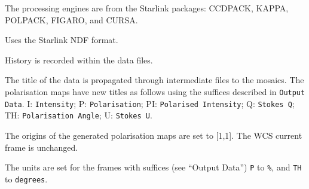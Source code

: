 \documentclass[twoside,11pt]{article}
\newcommand{\htmlref}[2]{#1}
\newcommand{\xref}[3]{#1}
\renewcommand{\_}{\texttt{\symbol{95}}}
\newcommand{\CCDPACK}{{\footnotesize CCDPACK}}
\newcommand{\CURSA}{{\footnotesize CURSA}}
\newcommand{\FIGARO}{\mbox{\footnotesize FIGARO}}
\newcommand{\KAPPA}{{\footnotesize KAPPA}}
\newcommand{\POLPACK}{{\footnotesize POLPACK}}
\newcommand{\sstitem}{\item}
\begin{document}
{{{         \sstitem
         The processing engines are from the Starlink packages: \xref{\CCDPACK}{sun139}{},
         \xref{\KAPPA}{sun95}{}, \xref{\POLPACK}{sun223}{}, 
         \xref{\FIGARO}{sun86}{}, and \xref{\CURSA}{sun190}{}.

         \sstitem
         Uses the Starlink NDF format.

         \sstitem
         History is recorded within the data files.

         \sstitem
         The title of the data is propagated through intermediate files
         to the mosaics.  The polarisation maps have new titles as follows
         using the suffices described in {\tt{Output Data}}.  I: {\tt{Intensity}};
         P: {\tt{Polarisation}}; PI: {\tt{Polarised Intensity}}; Q: {\tt{Stokes Q}};
         TH: {\tt{Polarisation Angle}}; U: {\tt{Stokes U}}.

         \sstitem
         The origins of the generated polarisation maps are set to [1,1].
         The WCS current frame is unchanged.

         \sstitem
         The units are set for the frames with suffices (see \htmlref{``Output Data''}{pe_data})
         {\tt{P}} to {\tt{\%}}, and {\tt{TH}} to {\tt{degrees}}.
      }
   }
}
\end{document}
